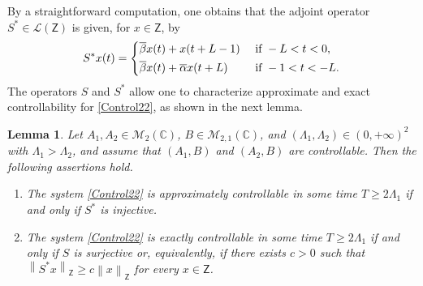 \documentclass[10pt]{amsart}
\theoremstyle{plain}
\newtheorem{lemm}[theo]{Lemma}
\theoremstyle{definition}
\newcommand{\norm}[1]{\left\lVert #1\right\lVert}
\begin{document}
By a straightforward computation, one obtains that the adjoint operator $S^\ast \in \mathcal L(\mathsf Z)$ is given, for $x \in \mathsf Z$, by
\begin{equation}
\label{SAst}
S^\ast x(t) =
\begin{dcases}
\overline\beta x(t) + x(t + L - 1) & \text{ if } -L < t < 0, \\
\overline\beta x(t) + \overline\alpha x(t + L) & \text{ if } -1 < t < -L.
\end{dcases}
\end{equation}
The operators $S$ and $S^\ast$ allow one to characterize approximate and exact controllability for \eqref{Control22}, as shown in the next lemma.

\begin{lemm}
\label{LemmS}
Let $A_1, A_2 \in \mathcal M_2(\mathbb C)$, $B \in \mathcal M_{2, 1}(\mathbb C)$, and $(\Lambda_1, \Lambda_2) \in (0, +\infty)^2$ with $\Lambda_1 > \Lambda_2$, and assume that $(A_1, B)$ and $(A_2, B)$ are controllable. Then the following assertions hold.
\begin{enumerate}
\item\label{Syst22SInj} The system \eqref{Control22} is approximately controllable in some time $T \geq 2 \Lambda_1$ if and only if $S^\ast$ is injective.

\item\label{Syst22SAstSurj} The system \eqref{Control22} is exactly controllable in some time $T \geq 2 \Lambda_1$ if and only if $S$ is surjective or, equivalently, if there exists $c > 0$ such that $\norm{S^\ast x}_{\mathsf Z} \geq c \norm{x}_{\mathsf Z}$ for every $x \in \mathsf Z$.
\end{enumerate}
\end{lemm}
\end{document}
